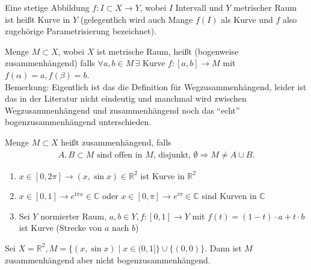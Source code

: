 \begin{definition}
    Eine stetige Abbildung $f: I \subset X \to Y$, wobei $I$ Intervall und $Y$ metrischer Raum ist heißt Kurve in $Y$ (gelegentlich wird auch Mange $f(I)$ als Kurve und $f$ also zugehörige Parametrisierung bezeichnet).
\end{definition}

\begin{definition}
    Menge $M \subset X$, wobei $X$ ist metrische Raum, heißt  (bogenweise zusammenhängend) falls $\forall a,b \in M \,\exists$ Kurve $f: [a,b] \to M$ mit $f(\alpha) = a, f(\beta) = b$.\\
    Bemerkung: Eigentlich ist das die Definition für Wegzusammenhängend, leider ist das in der Literatur nicht eindeutig und manchmal wird zwischen Wegzusammenhängend und zusammenhängend noch das "`echt"' bogenzusammenhängend unterschieden. %
\end{definition}

\begin{definition}
    Menge $M \subset X$ heißt zusammenhängend, falls
    \begin{align}
        A, B \subset M \text{ sind offen in }M\text{, disjunkt, }\emptyset \Rightarrow M \neq A \cup B.
    \end{align}
\end{definition}

\begin{example}
    \begin{enumerate}[label={\arabic*)}]
    \item $x \in [0,2\pi] \to (x,\sin x) \in \mathbb{R}^2$ ist Kurve in $\mathbb{R}^2$
    \item $x \in [0,1] \to e^{î\pi x} \in \mathbb{C}$ oder $x \in [0,\pi]\to e^{i\pi} \in \mathbb{C}$ sind Kurven in $\mathbb{C}$
    \item Sei $Y$ normierter Raum, $a,b \in Y,f:[0,1] \to Y$ mit $f(t) = (1-t)\cdot a + t\cdot b$ ist Kurve (Strecke von $a$ nach $b$)
    \end{enumerate}
\end{example}

\begin{example}
    Sei $X=\mathbb{R}^2, M = \{(x,\sin x) \mid x \in (0,1]\} \cup \{(0,0)\}$. Dann ist $M$ zusammenhängend aber nicht bogenzusammenhängend.
\end{example}

